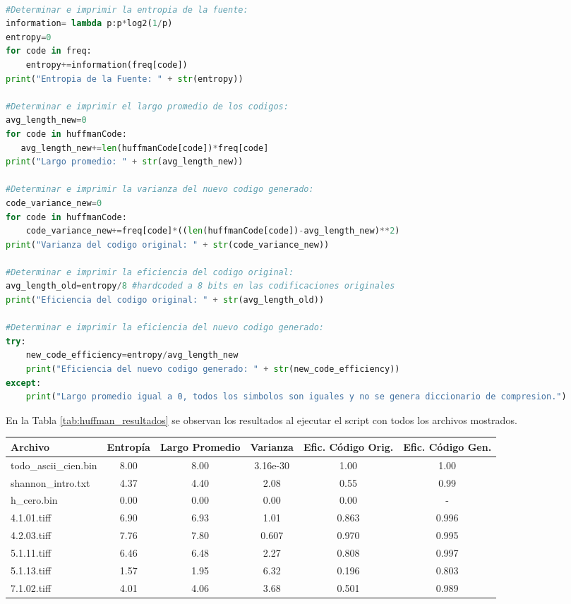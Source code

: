 \documentclass[conference,onecolumn,12pt]{IEEEtran}
\numberwithin{equation}{subsection}
\begin{document}
\begin{lstlisting}[language=Python, caption={Modificación del script para el cálculo de nuevos parámetros}, label={listing1}]

#Determinar e imprimir la entropia de la fuente:
information= lambda p:p*log2(1/p)
entropy=0
for code in freq:
    entropy+=information(freq[code])
print("Entropia de la Fuente: " + str(entropy))

#Determinar e imprimir el largo promedio de los codigos:
avg_length_new=0
for code in huffmanCode:
   avg_length_new+=len(huffmanCode[code])*freq[code]
print("Largo promedio: " + str(avg_length_new))

#Determinar e imprimir la varianza del nuevo codigo generado:
code_variance_new=0
for code in huffmanCode:
    code_variance_new+=freq[code]*((len(huffmanCode[code])-avg_length_new)**2)
print("Varianza del codigo original: " + str(code_variance_new))

#Determinar e imprimir la eficiencia del codigo original:
avg_length_old=entropy/8 #hardcoded a 8 bits en las codificaciones originales
print("Eficiencia del codigo original: " + str(avg_length_old))

#Determinar e imprimir la eficiencia del nuevo codigo generado:
try:
    new_code_efficiency=entropy/avg_length_new
    print("Eficiencia del nuevo codigo generado: " + str(new_code_efficiency))
except:
    print("Largo promedio igual a 0, todos los simbolos son iguales y no se genera diccionario de compresion.")

\end{lstlisting}


En la Tabla \ref{tab:huffman_resultados} se observan los resultados al ejecutar el script con todos los archivos mostrados.

 \begin{table*}[h!]
    \centering
    \caption{Resultados de codificación Huffman sobre distintos archivos.}
    \label{tab:huffman_resultados}
    \begin{tabular}{lccccc}
    \toprule
    \textbf{Archivo} & \textbf{Entropía} & \textbf{Largo Promedio} & \textbf{Varianza} & \textbf{Efic. Código Orig.} & \textbf{Efic. Código Gen.} \\
    \midrule
    todo\_ascii\_cien.bin & 8.00 & 8.00 & 3.16e-30 & 1.00 & 1.00 \\
    shannon\_intro.txt & 4.37 & 4.40 & 2.08 & 0.55 & 0.99 \\
    h\_cero.bin & 0.00 & 0.00 & 0.00 & 0.00 & - \\
    4.1.01.tiff & 6.90 & 6.93 & 1.01 & 0.863 & 0.996 \\
    4.2.03.tiff & 7.76 & 7.80 & 0.607 & 0.970 & 0.995 \\
    5.1.11.tiff & 6.46 & 6.48 & 2.27 & 0.808 & 0.997 \\
    5.1.13.tiff & 1.57 & 1.95 & 6.32 & 0.196 & 0.803 \\
    7.1.02.tiff & 4.01 & 4.06 & 3.68 & 0.501 & 0.989 \\
    \bottomrule
    \end{tabular}
\end{table*}
\end{document}
